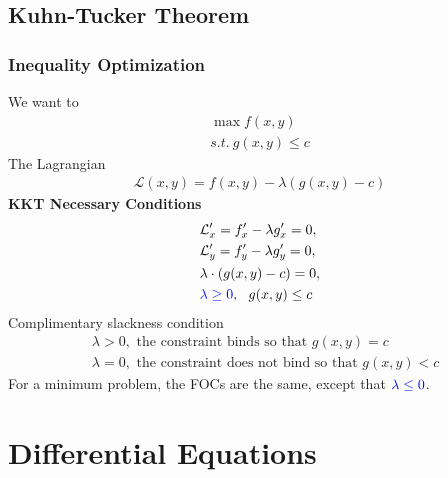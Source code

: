 \documentclass[
10pt, %
]{beamer}
\newcommand{\blue}[1]{\textcolor{blue}{#1}}
\begin{document}
\subsection{Kuhn-Tucker Theorem}
\begin{frame}
\frametitle{Inequality Optimization}
We want to
		\begin{align*}
			\max f(x,y)  \\ s.t. \ g(x,y) \leq c 
		\end{align*}
The Lagrangian
		\begin{align*}
				\mathcal{L} (x,y) = f(x,y) - \lambda (g(x,y) - c) 
		\end{align*}
\textbf{KKT Necessary Conditions}
					\begin{align*}
				& \mathcal{L}'_x = f'_x - \lambda g'_x = 0, \\
				& \mathcal{L}'_y = f'_y - \lambda g'_y = 0, \\
				& \lambda \cdot ( g(x,y) - c) = 0,                \\
				& \blue{\lambda \geq 0},             \       \
				 g(x,y) \leq c                             
			\end{align*}
Complimentary slackness condition
			\begin{align*}
				& \lambda > 0, \text{ the constraint binds so that $g(x,y) =c$}          \\
				& \lambda = 0, \text{ the constraint does not bind so that $g(x,y) < c$}
			\end{align*}
For a minimum problem, the FOCs are the same, except that $\blue{\lambda \leq 0}$.
\end{frame}

\section{Differential Equations}
\end{document}
